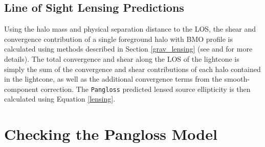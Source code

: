 \documentclass[%
 reprint,
 amsmath,amssymb,
 aps,nofootinbib
]{revtex4-1}
\begin{document}
\subsection{Line of Sight Lensing Predictions}

Using the halo mass and physical separation distance to the LOS, the shear and convergence contribution of a single foreground halo with BMO profile is calculated using methods described in Section \ref{grav_lensing} (see \cite{nfw_bmo} and \cite{lensing_calc} for more details). The total convergence and shear along the LOS of the lightcone is simply the sum of the convergence and shear contributions of each halo contained in the lightcone, as well as the additional convergence terms from the smooth-component correction. The \texttt{Pangloss} predicted lensed source ellipticity is then calculated using Equation \eqref{lensing}.


\section{Checking the Pangloss Model} \label{check}
\end{document}
